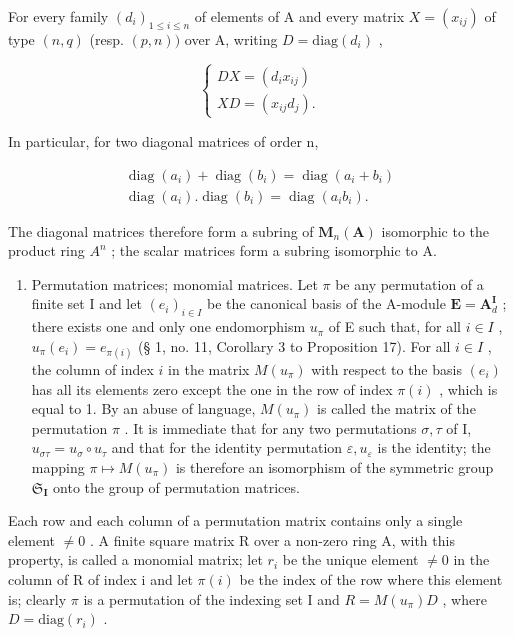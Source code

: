 For every family \((d_i)_{1\leqslant i\leqslant n}\) of elements of A and every matrix \(X = (x_{ij})\) of type \((n,q)\) (resp. \((p,n))\) over A, writing \(D = \mathrm{diag}(d_i)\) ,

\[
\left\{ \begin{array}{l} D X = (d _ {i} x _ {i j}) \\ X D = (x _ {i j} d _ {j}). \end{array} \right.\tag{30}
\]

In particular, for two diagonal matrices of order n,

\[
\begin{array}{c} \operatorname{diag} (a _ {i}) + \operatorname{diag} (b _ {i}) = \operatorname{diag} (a _ {i} + b _ {i}) \\ \operatorname{diag} (a _ {i}). \operatorname{diag} (b _ {i}) = \operatorname{diag} (a _ {i} b _ {i}). \end{array}\tag{31}
\]

The diagonal matrices therefore form a subring of \(\mathbf{M}_{n}(\mathbf{A})\) isomorphic to the product ring \(A^{n}\) ; the scalar matrices form a subring isomorphic to A.

\begin{enumerate}
\def\labelenumi{\Roman{enumi}.}
\setcounter{enumi}{1}
\tightlist
\item
  Permutation matrices; monomial matrices. Let \(\pi\) be any permutation of a finite set I and let \((e_i)_{i\in I}\) be the canonical basis of the A-module \(\mathbf{E} = \mathbf{A}_d^{\mathbf{I}}\) ; there exists one and only one endomorphism \(u_{\pi}\) of E such that, for all \(i\in I\) , \(u_{\pi}(e_i) = e_{\pi(i)}\) (§ 1, no. 11, Corollary 3 to Proposition 17). For all \(i\in I\) , the column of index \(i\) in the matrix \(M(u_{\pi})\) with respect to the basis \((e_i)\) has all its elements zero except the one in the row of index \(\pi(i)\) , which is equal to 1. By an abuse of language, \(M(u_{\pi})\) is called the matrix of the permutation \(\pi\) . It is immediate that for any two permutations \(\sigma, \tau\) of I, \(u_{\sigma \tau} = u_{\sigma} \circ u_{\tau}\) and that for the identity permutation \(\varepsilon, u_{\varepsilon}\) is the identity; the mapping \(\pi \mapsto M(u_{\pi})\) is therefore an isomorphism of the symmetric group \(\mathfrak{S}_{\mathbf{I}}\) onto the group of permutation matrices.
\end{enumerate}

Each row and each column of a permutation matrix contains only a single element \(\neq0\) . A finite square matrix R over a non-zero ring A, with this property, is called a monomial matrix; let \(r_{i}\) be the unique element \(\neq0\) in the column of R of index i and let \(\pi(i)\) be the index of the row where this element is; clearly \(\pi\) is a permutation of the indexing set I and \(R=M(u_{\pi})D\) , where \(D=\mathrm{diag}(r_{i})\) .

